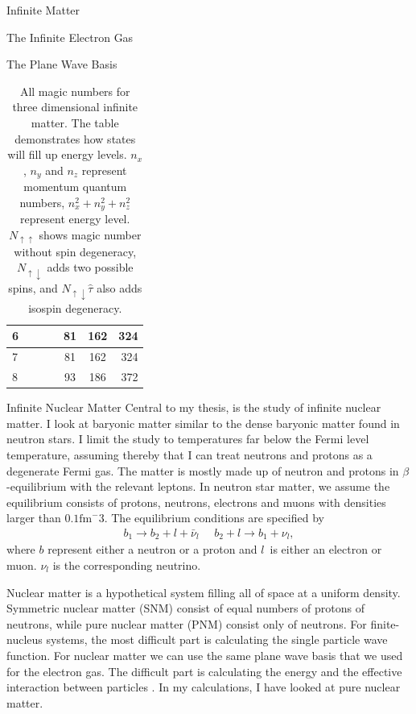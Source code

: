 \documentclass[twoside,english]{uiofysmaster}
\begin{document}
\begin{chapter}{Infinite Matter}
\begin{section}{The Infinite Electron Gas}
\begin{subsection}{The Plane Wave Basis}
\begin{table}[H]
\begin{center}
\begin{tabular}[center]{l | c c c | c | c | r }
						\hline
						6 &   &   &   & 81&162&324\\
						\hline
						7 &   &   &   & 81&162&324\\
						\hline
						8 &   &   &   & 93&186&372
					\end{tabular}
				\end{center}
				\caption{All magic numbers for three dimensional infinite matter. The table demonstrates how states will fill up energy levels. $n_x$, $n_y$ and $n_z$ represent momentum quantum numbers, $n_x^2 + n_y^2 + n_z^2$ represent energy level. $N_{\uparrow \uparrow}$ shows magic number without spin degeneracy, $N_{\uparrow \downarrow}$ adds two possible spins, and $N_{\uparrow \downarrow} \hat \tau $ also adds isospin degeneracy.} 
				\label{Magic Numbers 3d}
			\end{table}

		\end{subsection}

	\end{section}

	\begin{section}{Infinite Nuclear Matter}
		Central to my thesis, is the study of infinite nuclear matter. I look at baryonic matter similar to the dense baryonic matter found in neutron stars. I limit the study to temperatures far below the Fermi level temperature, assuming thereby that I can treat neutrons and protons as a degenerate Fermi gas. The matter is mostly made up of neutron and protons in $\beta$-equilibrium with the relevant leptons. In neutron star matter, we assume the equilibrium consists of protons, neutrons, electrons and muons with densities larger than $0.1 \text{fm}^-3$. The equilibrium conditions are specified by
		\begin{align}
		 	b_1 \rightarrow b_2 + l + \bar \nu_l \:\:\:\:\:\: b_2 + l \rightarrow b_1 + \nu_l,
		\end{align} 
		where $b$ represent either a neutron or a proton and $l$ is either an electron or muon. $\nu_l$ is the corresponding neutrino. 

		Nuclear matter is a hypothetical system filling all of
                space at a uniform density. Symmetric nuclear matter
                (SNM) consist of equal numbers of protons of neutrons,
                while pure nuclear matter (PNM) consist only of
                neutrons. For finite-nucleus systems, the most
                difficult part is calculating the single particle wave
                function. For nuclear matter we can use the same plane
                wave basis that we used for the electron gas. The
                difficult part is calculating the energy and the
                effective interaction between particles
                \cite{Day1967}. In my calculations, I have looked at
                pure nuclear matter.
	\end{section}


\end{chapter}
\end{document}
